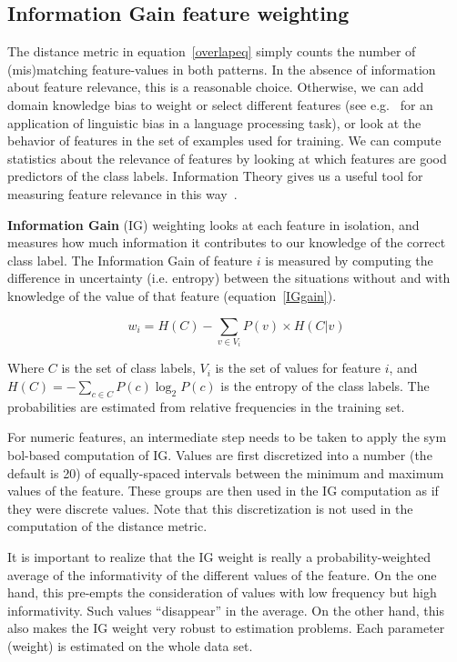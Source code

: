 \documentclass{report}
\begin{document}
\subsection{Information Gain feature weighting}
\label{infogain}

The distance metric in equation~\ref{overlapeq} simply counts the
number of (mis)matching feature-values in both patterns. In the
absence of information about feature relevance, this is a reasonable
choice. Otherwise, we can add domain knowledge bias to weight or
select different features (see e.g.~ for an
application of linguistic bias in a language processing task), or look
at the behavior of features in the set of examples used for
training. We can compute statistics about the relevance of features by
looking at which features are good predictors of the class
labels. Information Theory gives us a useful tool for measuring
feature relevance in this way~\cite{Quinlan86,Quinlan93}.

{\bf Information Gain} (IG) weighting looks at each feature in
isolation, and measures how much information it contributes to our
knowledge of the correct class label. The Information Gain of feature
$i$ is measured by computing the difference in uncertainty
(i.e. entropy) between the situations without and with knowledge of
the value of that feature (equation~\ref{IGgain}).

\begin{equation}
w_{i} = H(C) -  \sum_{v \in V_{i}} P(v) \times H(C|v)
\label{IGgain}
\end{equation}

Where $C$ is the set of class labels, $V_{i}$ is the set of values for
feature $i$, and $H(C) = - \sum_{c \in C} P(c) \log_{2} P(c)$ is the
entropy of the class labels. The probabilities are estimated from
relative frequencies in the training set. 

For numeric features, an intermediate step needs to be taken to apply
the sym bol-based computation of IG. Values are first discretized into
a number (the default is 20) of equally-spaced intervals between the
minimum and maximum values of the feature. These groups are then used
in the IG computation as if they were discrete values. Note that this
discretization is not used in the computation of the distance metric.

It is important to realize that the IG weight is really a
probability-weighted average of the informativity of the different
values of the feature. On the one hand, this pre-empts the
consideration of values with low frequency but high
informativity. Such values ``disappear'' in the average. On the other
hand, this also makes the IG weight very robust to estimation
problems. Each parameter (weight) is estimated on the whole data set.
\end{document}
